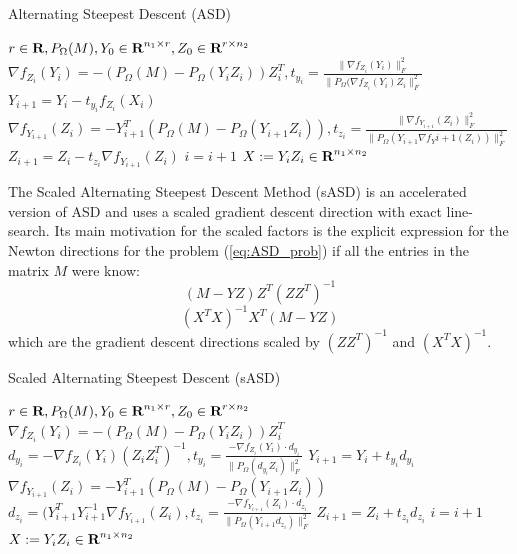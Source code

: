 \documentclass[12pt]{article}
\begin{document}
\begin{algorithm}[h]
\caption{Alternating Steepest Descent (ASD)~\cite{Tanner:2014}}
\begin{algorithmic}
\Require $r \in {\mbox{\bf R}}, P_{\Omega}(M), Y_0\in {\mbox{\bf R}}^{n_1\times r}, Z_0\in {\mbox{\bf R}}^{r\times n_2}$
\Repeat
	\State $\nabla f_{Z_i}(Y_i) = -(P_{\Omega}(M) - P_{\Omega}(Y_i Z_i))Z_i^T, t_{y_i} = \frac{\|  \nabla f_{Z_i}(Y_i) \|^2_F}{\| P_{\Omega}(\nabla f_{Z_i} (Y_i)Z_i \|^2_F}$
	\State $Y_{i+1} = Y_i - t_{y_i} f_{Z_i}(X_i)$
	\State $\nabla f_{Y_{i+1}}(Z_i) = -Y^T_{i+1}(P_{\Omega}(M)-P_{\Omega}(Y_{i+1}Z_i)), t_{z_i} = \frac{\|  \nabla f_{Y_{i+1}}(Z_i) \|^2_F}{\| P_{\Omega}(Y_{i+1} \nabla f_Y{i+1} (Z_i)) \|^2_F}$
	\State $Z_{i+1} = Z_i - t_{z_i}\nabla f_{Y_{i+1}}(Z_i)$
	\State $i = i +1$
\Ensure $X:= Y_i Z_i \in {\mbox{\bf R}}^{n_1\times n_2}$
\end{algorithmic}
\end{algorithm}

The Scaled Alternating Steepest Descent Method (sASD) is an accelerated version of ASD and uses a scaled gradient descent direction with exact line-search. Its main motivation for the scaled factors is the explicit expression for the Newton directions for the problem (\ref{eq:ASD_prob}) if all the entries in the matrix $M$ were know:
\[
(M - YZ)Z^T(ZZ^T)^{-1}
\]
\[
(X^TX)^{-1}X^T(M-YZ)
\]
which are the gradient descent directions scaled by $(ZZ^T)^{-1}$ and $(X^TX)^{-1}$.

\begin{algorithm}[h]
\caption{Scaled Alternating Steepest Descent (sASD)~\cite{Tanner:2014}}
\begin{algorithmic}
\Require $r \in {\mbox{\bf R}}, P_{\Omega}(M), Y_0\in {\mbox{\bf R}}^{n_1\times r}, Z_0\in {\mbox{\bf R}}^{r\times n_2}$
\Repeat
	\State $\nabla f_{Z_i}(Y_i) = -(P_{\Omega}(M) - P_{\Omega}(Y_i Z_i))Z_i^T$
	\State $d_{y_i} = -\nabla f_{Z_i} (Y_i)(Z_iZ_i^T)^{-1}, t_{y_i} =\frac{ -\nabla f_{Z_i}(Y_i)\cdot d_{y_i}}{\| P_{\Omega} (d_{y_i}Z_i)\|_F^2}$
	\State $Y_{i+1} = Y_i + t_{y_i}d_{y_i}$
	\State $\nabla f_{Y_{i+1}} (Z_i) = - Y_{i+1}^T(P_{\Omega}(M) - P_{\Omega}(Y_{i+1}Z_i))$
	\State $d_{z_i} = (Y_{i+1}^TY_{i+1}^{-1} \nabla f_{Y_{i+1}}(Z_i), t_{z_i} = \frac{-\nabla f_{Y_{i+1}}(Z_i)\cdot d_{z_i}}{\| P_{\Omega}(Y_{i+1}d_{z_i})\|_F^2}$
	\State $Z_{i+1} = Z_i + t_{z_i} d_{z_i}$
	\State $i = i + 1$
\Ensure $X:= Y_i Z_i \in {\mbox{\bf R}}^{n_1\times n_2}$
\end{algorithmic}
\end{algorithm}
\end{document}
